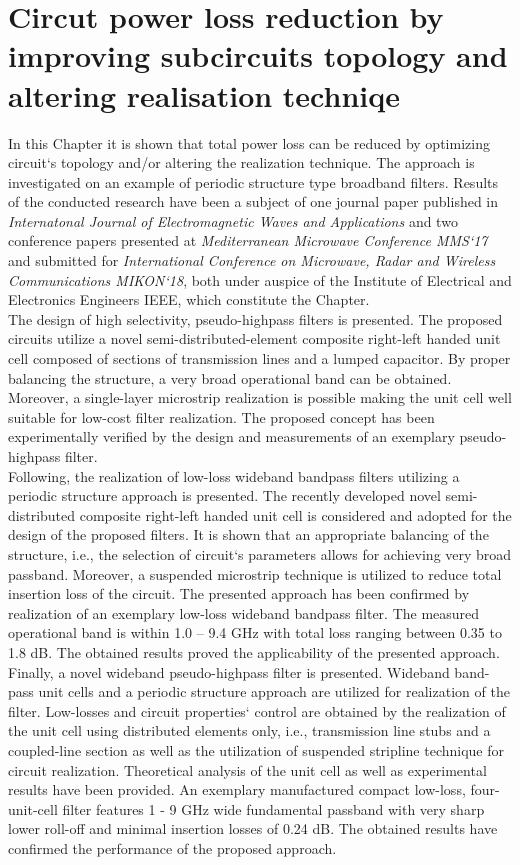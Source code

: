 \chapter{Circut power loss reduction by improving subcircuits topology and altering realisation techniqe}\label{chap4}

\indent In this Chapter it is shown that total power loss can be reduced by optimizing circuit`s topology and/or altering the realization technique. The approach is investigated on an example of periodic structure type broadband filters. Results of the conducted research have been a subject of one journal paper published in \textit{Internatonal Journal of Electromagnetic Waves and Applications} and two conference papers presented at \textit{Mediterranean Microwave Conference MMS`17} and submitted for \textit{International Conference on Microwave, Radar and Wireless Communications MIKON`18}, both under auspice of the Institute of Electrical and Electronics Engineers IEEE, which constitute the Chapter.
\\
\indent The design of high selectivity, pseudo-highpass filters is presented. The proposed circuits utilize a novel semi-distributed-element composite right-left handed unit cell composed of sections of transmission lines and a lumped capacitor. By proper balancing the structure, a very broad operational band can be obtained. Moreover, a single-layer microstrip realization is possible making the unit cell well suitable for low-cost filter realization. The proposed concept has been experimentally verified by the design and measurements of an exemplary pseudo-highpass filter.
\\
\indent Following, the realization of low-loss wideband bandpass filters utilizing a periodic structure approach is presented. The recently developed novel semi-distributed composite right-left handed unit cell is considered and adopted for the design of the proposed filters. It is shown that an appropriate balancing of the structure, i.e., the selection of circuit`s parameters allows for achieving very broad passband. Moreover, a suspended microstrip technique is utilized to reduce total insertion loss of the circuit. The presented approach has been confirmed by realization of an exemplary low-loss wideband bandpass filter. The measured operational band is within 1.0 – 9.4 GHz with total loss ranging between 0.35 to 1.8 dB. The obtained results proved the applicability of the presented approach.
\\
\indent Finally, a novel wideband pseudo-highpass filter is presented. Wideband band-pass unit cells and a periodic structure approach are utilized for realization of the filter. Low-losses and circuit properties` control are obtained by the realization of the unit cell using distributed elements only, i.e., transmission line stubs and a coupled-line section as well as the utilization of suspended stripline technique for circuit realization. Theoretical analysis of the unit cell as well as experimental results have been provided. An exemplary manufactured compact low-loss, four-unit-cell filter features 1 - 9 GHz wide fundamental passband with very sharp lower roll-off and minimal insertion losses of 0.24 dB. The obtained results have confirmed the performance of the proposed approach.

